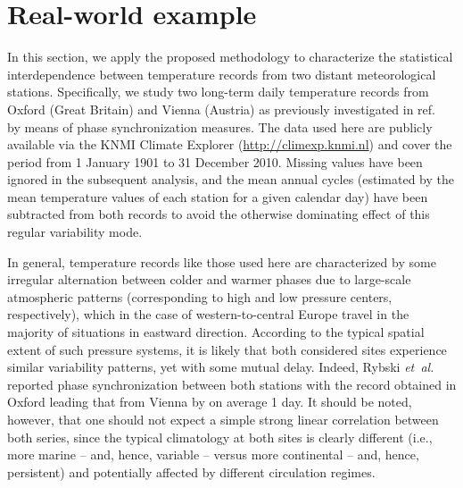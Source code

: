 \documentclass[12pt,aip,cha,reprint,nofootinbib]{revtex4-1}
\begin{document}
\section{Real-world example}  \label{sec:exp}
In this section, we apply the proposed methodology to characterize the statistical interdependence between temperature records from two distant meteorological stations. Specifically, we study two long-term daily temperature records from Oxford (Great Britain) and Vienna (Austria) as previously investigated in ref.~\cite{Rybski2003} by means of phase synchronization measures. The data used here are publicly available via the KNMI Climate Explorer (\url{http://climexp.knmi.nl}) and cover the period from 1 January 1901 to 31 December 2010. Missing values have been ignored in the subsequent analysis, and the mean annual cycles (estimated by the mean temperature values of each station for a given calendar day) have been subtracted from both records to avoid the otherwise dominating effect of this regular variability mode. 

In general, temperature records like those used here are characterized by some irregular alternation between colder and warmer phases due to large-scale atmospheric patterns (corresponding to high and low pressure centers, respectively), which in the case of western-to-central Europe travel in the majority of situations in eastward direction. According to the typical spatial extent of such pressure systems, it is likely that both considered sites experience similar variability patterns, yet with some mutual delay. Indeed, Rybski \emph{et~al.}~\cite{Rybski2003} reported phase synchronization between both stations with the record obtained in Oxford leading that from Vienna by on average 1 day. It should be noted, however, that one should not expect a simple strong linear correlation between both series, since the typical climatology at both sites is clearly different (i.e., more marine -- and, hence, variable -- versus more continental -- and, hence, persistent) and potentially affected by different circulation regimes.
\end{document}
